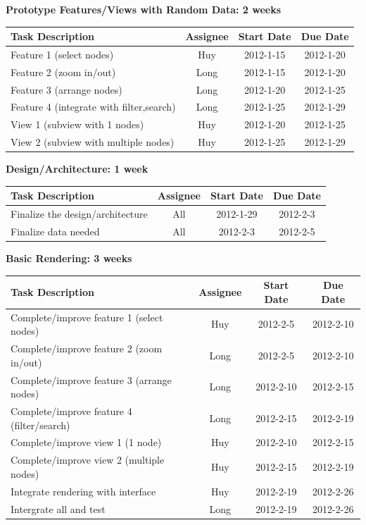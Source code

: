 \documentclass[12pt, letterpaper]{article}
\begin{document}
\begin{center}
		{\bf Prototype Features/Views with Random Data: 2 weeks}
    \begin{tabular}{| p{8.3cm} || c | c | c | }
      \hline
      Task Description & Assignee & Start Date & Due Date \\
      \hline
	    Feature 1 (select nodes) & Huy & 2012-1-15 & 2012-1-20 \\
	    Feature 2 (zoom in/out)  & Long & 2012-1-15 & 2012-1-20 \\
	    Feature 3 (arrange nodes)  & Long & 2012-1-20 & 2012-1-25 \\
	    Feature 4 (integrate with filter,search)  & Long & 2012-1-25 & 2012-1-29 \\
            View 1 (subview with 1 nodes)  & Huy & 2012-1-20 & 2012-1-25 \\
	    View 2 (subview with multiple nodes)  & Huy & 2012-1-25 & 2012-1-29 \\
      \hline
    \end{tabular}
  \end{center}

  \begin{center}
		{\bf Design/Architecture: 1 week}
    \begin{tabular}{|p{8.3cm} || c | c | c | }
      \hline
      Task Description & Assignee & Start Date & Due Date \\
      \hline
	    Finalize the design/architecture & All & 2012-1-29 & 2012-2-3 \\
	    Finalize data needed  & All & 2012-2-3 & 2012-2-5 \\
      \hline
    \end{tabular}
  \end{center}

  \begin{center}
		{\bf Basic Rendering: 3 weeks}
    \begin{tabular}{| p{8.3cm} || c | c | c | }
      \hline
      Task Description & Assignee & Start Date & Due Date \\
      \hline
 	    Complete/improve feature 1 (select nodes) & Huy & 2012-2-5 & 2012-2-10 \\
	    Complete/improve feature 2 (zoom in/out)  & Long & 2012-2-5 & 2012-2-10 \\
	    Complete/improve feature 3 (arrange nodes)  & Long & 2012-2-10 & 2012-2-15 \\
	    Complete/improve feature 4 (filter/search)  & Long & 2012-2-15 & 2012-2-19 \\
	    Complete/improve view 1 (1 node)  & Huy& 2012-2-10 & 2012-2-15 \\
            Complete/improve view 2 (multiple nodes)  & Huy & 2012-2-15 & 2012-2-19 \\
            Integrate rendering with interface  & Huy & 2012-2-19 & 2012-2-26 \\  
            Intergrate all and test  & Long & 2012-2-19 & 2012-2-26 \\
      \hline
    \end{tabular}
  \end{center}
\end{document}
